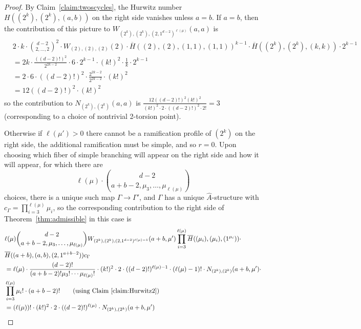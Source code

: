 \documentclass[thesis]{thesis-umich}           %
\theoremstyle{definition}
\begin{document}
\begin{proof}

    By Claim~\ref{claim:twoscycles}, the Hurwitz number $H((2^k),(2^k),(a,b))$ on the right
    side vanishes unless $a=b$.
    If $a=b$, then the contribution of this picture to $W_{(2^k),(2^k),(2,1^{d-2})^{\ell(\mu)}}(a,a)$ is
    \begin{align*}
      &2\cdot k\cdot \binom{d-2}{2,\dots,2}^2\cdot W_{(2),(2),(2)}(2)\cdot \overline H((2),(2),(1,1),(1,1))^{k-1}\cdot \overline H((2^k),(2^k),(k,k))\cdot 2^{k-1} \\
      &=2k\cdot\frac{((d-2)!)^2}{2^{2k-2}}\cdot 6\cdot 2^{k-1}\cdot (k!)^2\cdot\frac 1k\cdot 2^{k-1} \\
      &=2\cdot 6\cdot ((d-2)!)^2\cdot\frac{2^{2k-2}}{2^{2k-2}}\cdot (k!)^2 \\
      &=12((d-2)!)^2\cdot (k!)^2
      \end{align*}
    so the contribution to $N_{(2^k),(2^k)}(a,a)$ is
    $\frac{12((d-2)!)^2(k!)^2}{(k!)^2\cdot 2\cdot ((d-2)!)^2\cdot 2!}=3$ (corresponding to a choice of nontrivial 2-torsion point).
  
  Otherwise if $\ell(\mu')>0$ there cannot be a ramification profile of $(2^k)$
  on the right side, the additional ramification must be simple, and so $r=0$.
  Upon
  choosing which fiber of simple branching will appear on the right side and how it will appear,
  for which there are
  \[
  \ell(\mu)\cdot \binom{d-2}{a+b-2,\mu_3,\dots,\mu_{\ell(\mu)}}
  \]
  choices, there is a unique such map $\Gamma\to\Gamma'$, and $\Gamma$ has a unique $\hat A$-structure
  with $c_{\Gamma}=\prod\limits_{i=3}^{\ell(\mu)}\mu_i$, so the corresponding contribution to the right side of Theorem~\ref{thm:admissible} in this case is
  \begin{align*}
    &\ell(\mu)\binom{d-2}{a+b-2,\mu_3,\dots,\mu_{\ell(\mu)}} W_{(2^k),(2^k),(2,1^{d-2})^{\ell(\mu)-1}}(a+b,\mu') \prod_{i=3}^{\ell(\mu)}\overline H((\mu_i),(\mu_i),(1^{\mu_i})) \cdot \\
    &\overline H((a+b),(a,b),(2,1^{a+b-2})) c_{\Gamma} \\
    &=\ell(\mu)\cdot\frac{(d-2)!}{(a+b-2)!\mu_3!\cdots\mu_{\ell(\mu)}!}\cdot (k!)^2\cdot 2\cdot((d-2)!)^{\ell(\mu)-1}\cdot (\ell(\mu)-1)!\cdot N_{(2^k),(2^k)}(a+b,\mu')\cdot \\
    &\prod_{i=3}^{\ell(\mu)}\mu_i!\cdot (a+b-2)! \tag*{(using Claim~\ref{claim:Hurwitz2})} \\
    &=(\ell(\mu))!\cdot (k!)^2\cdot 2\cdot((d-2)!)^{\ell(\mu)}\cdot N_{(2^k),(2^k)}(a+b,\mu') \\
  \end{align*}


\end{proof}
\end{document}
